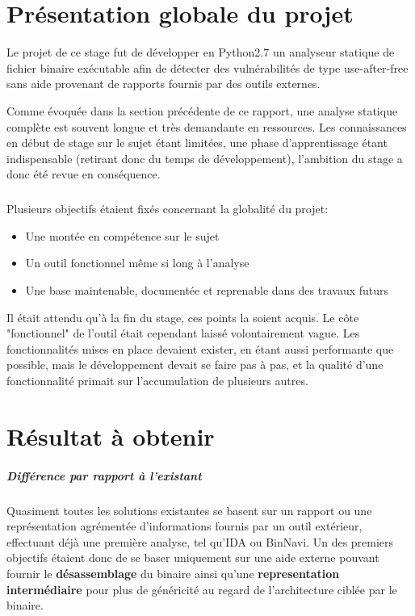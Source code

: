\section{Présentation globale du projet}

Le projet de ce stage fut de développer en Python2.7 un analyseur statique de fichier
binaire exécutable afin de détecter des vulnérabilités de type use-after-free sans aide
provenant de rapports fournis par des outils externes.


Comme évoquée dans la section précédente de ce rapport, une analyse statique complète est souvent
longue et très demandante en ressources. Les connaissances en début de stage sur le sujet étant limitées,
une phase d'apprentissage étant indispensable (retirant donc du temps de développement), l'ambition du stage
a donc été revue en conséquence.
\subparagraph{}
Plusieurs objectifs étaient fixés concernant la globalité du projet:
\begin{itemize}
        \item Une montée en compétence sur le sujet
        \item Un outil fonctionnel même si long à l'analyse
        \item Une base maintenable, documentée et reprenable dans des travaux futurs
\end{itemize}

Il était attendu qu'à la fin du stage, ces points la soient acquis. Le côte "fonctionnel"
de l'outil était cependant laissé volontairement vague. Les fonctionnalités mises en place
devaient exister, en étant aussi performante que possible, mais le développement devait se faire
pas à pas, et la qualité d'une fonctionnalité primait sur l'accumulation de plusieurs autres.

\section{Résultat à obtenir}

\subparagraph{Différence par rapport à l'existant}

Quasiment toutes les solutions existantes se basent sur un rapport ou une représentation agrémentée d'informations fournis
par un outil extérieur, effectuant déjà une première analyse, tel qu'IDA ou BinNavi. Un des premiers objectifs étaient donc de
se baser uniquement sur une aide externe pouvant fournir le \textbf{désassemblage} du binaire ainsi qu'une \textbf{representation intermédiaire}
pour plus de généricité au regard de l'architecture ciblée par le binaire.

